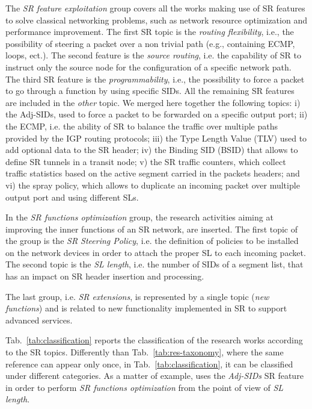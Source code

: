 The \emph{SR feature exploitation} group covers all the works making use of SR features to solve classical networking problems, such as network resource optimization and performance improvement. The first SR topic is the \emph{routing flexibility}, i.e., the possibility of steering a packet over a non trivial path (e.g., containing ECMP, loops, ect.).
The second feature is the \emph{source routing}, i.e. the capability of SR to instruct only the source node for the configuration of a specific network path.
The third SR feature is the \emph{programmability}, i.e., the possibility to force a packet to go through a function by using specific SIDs.
All the remaining SR features are included in the \emph{other} topic.
We merged here together the following topics: i) the Adj-SIDs, used to force a packet to be forwarded on a specific output port; ii) the ECMP, i.e. the ability of SR to balance the traffic over multiple paths provided by the IGP routing protocols; iii) the Type Length Value (TLV) used to add optional data to the SR header; iv) the Binding SID (BSID) that allows to define SR tunnels in a transit node; v) the SR traffic counters, which collect traffic statistics based on the active segment carried in the packets headers; and vi) the spray policy, which allows to duplicate an incoming packet over multiple output port and using different SLs. 

In the \emph{SR functions optimization} group, the research activities aiming at improving the inner functions of an SR network, are inserted.
The first topic of the group is the \emph{SR Steering Policy}, i.e. the definition of policies to be installed on the network devices in order to attach the proper SL to each incoming packet. The second topic is  the \emph{SL length}, i.e. the number of SIDs of a segment list, that has an impact on SR header insertion and processing.

The last group, i.e. \emph{SR extensions}, is represented by a single topic (\emph{new functions}) and is related to new functionality implemented in SR to support advanced services.

Tab.~\ref{tab:classification} reports the classification of the research works according to the SR topics. Differently than Tab.~\ref{tab:res-taxonomy}, where the same reference can appear only once, in Tab.~\ref{tab:classification}, it can be classified under different categories. As a matter of example, \cite{translating} uses the \emph{Adj-SIDs} SR feature in order to perform \emph{SR functions optimization} from the point of view of \emph{SL length}.



